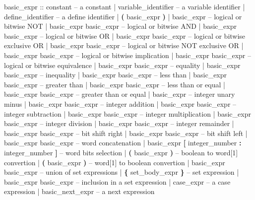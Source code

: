 \begin{Grammar}
basic_expr ::
      constant                      -- a constant
    | variable_identifier           -- a variable identifier
    | define_identifier             -- a define identifier
    | \textbf{(} basic_expr \textbf{)}
    | \operator{!} basic_expr                  -- logical or bitwise NOT
    | basic_expr \operator{\&} basic_expr       -- logical or bitwise AND
    | basic_expr \operator{|} basic_expr       -- logical or bitwise OR
    | basic_expr  basic_expr     -- logical or bitwise exclusive OR
    | basic_expr  basic_expr    -- logical or bitwise NOT exclusive OR
    | basic_expr \operator{->} basic_expr      -- logical or bitwise implication
    | basic_expr \operator{<->} basic_expr     -- logical or bitwise equivalence
    | basic_expr \operator{=} basic_expr       -- equality
    | basic_expr \operator{!=} basic_expr      -- inequality
    | basic_expr \operator{<} basic_expr       -- less than
    | basic_expr \operator{>} basic_expr       -- greater than
    | basic_expr \operator{<=} basic_expr      -- less than or equal
    | basic_expr \operator{>=} basic_expr      -- greater than or equal
    | \operator{-} basic_expr                  -- integer unary minus
    | basic_expr \operator{+} basic_expr       -- integer addition
    | basic_expr \operator{-} basic_expr       -- integer subtraction
    | basic_expr \operator{*} basic_expr       -- integer multiplication
    | basic_expr \operator{/} basic_expr       -- integer division
    | basic_expr  basic_expr     -- integer remainder
    | basic_expr \operator{>>} basic_expr      -- bit shift right
    | basic_expr \operator{<<} basic_expr      -- bit shift left
    | basic_expr \operator{::} basic_expr      -- word concatenation
    | basic_expr \textbf{[} integer_number \textbf{:} integer_number \textbf{]}
                                    -- word bits selection
    |  \textbf{(} basic_expr \textbf{)}          -- boolean to word[1] convertion
    |  \textbf{(} basic_expr \textbf{)}           -- word[1] to boolean convertion
    | basic_expr  basic_expr   -- union of set expressions 
    | \textbf{\{} set_body_expr \textbf{\}}             -- set expression
    | basic_expr  basic_expr      -- inclusion in a set expression
    | case_expr                     -- a case expression
    | basic_next_expr               -- a next expression
\end{Grammar}

